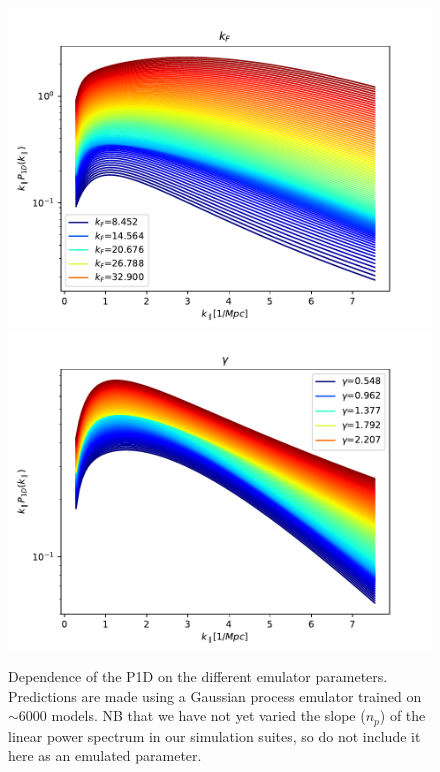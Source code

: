 \documentclass[]{article}
\begin{document}
\begin{figure}[h]
    \includegraphics[scale=0.47]{Figures/256_kF_Mpc.pdf}
    \includegraphics[scale=0.47]{Figures/256_gamma.pdf}
    \caption{Dependence of the P1D on the different emulator parameters. Predictions are 
    made using a Gaussian process emulator trained on $\sim6000$ models. NB that we have not 
    yet varied the slope ($n_p$) of the linear power spectrum in 
    our simulation suites, so do not include it here as an emulated parameter.}
\end{figure}

\clearpage
\end{document}
